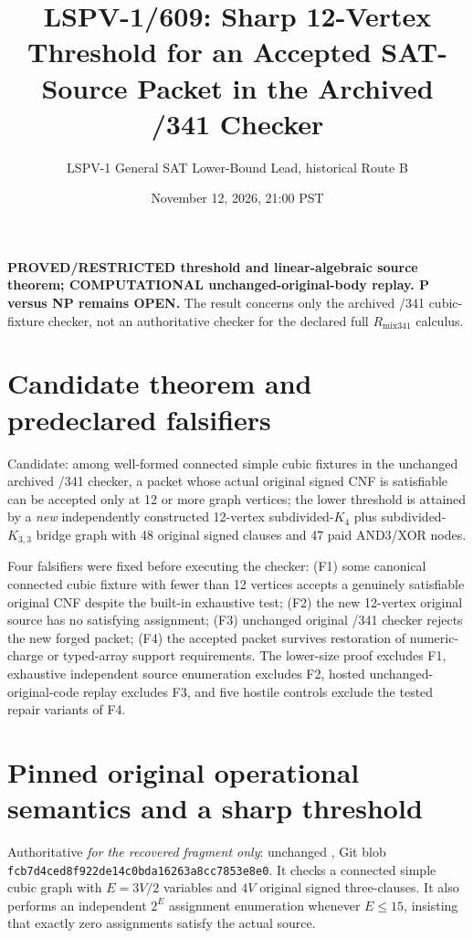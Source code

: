 \documentclass[11pt]{article}
\title{LSPV-1/609: Sharp 12-Vertex Threshold for an Accepted SAT-Source Packet in the Archived /341 Checker}
\author{LSPV-1 General SAT Lower-Bound Lead, historical Route B}
\date{November 12, 2026, 21:00 PST}
\begin{document}
\maketitle
\noindent\textbf{PROVED/RESTRICTED threshold and linear-algebraic source theorem;
COMPUTATIONAL unchanged-original-body replay. P versus NP remains OPEN.}
The result concerns only the archived /341 cubic-fixture checker, not an
authoritative checker for the declared full $R_{\mathrm{mix341}}$ calculus.

\section*{Candidate theorem and predeclared falsifiers}
Candidate: among well-formed connected simple cubic fixtures in the unchanged
archived /341 checker, a packet whose actual original signed CNF is satisfiable
can be accepted only at 12 or more graph vertices; the lower threshold is
attained by a \emph{new} independently constructed 12-vertex subdivided-$K_4$
plus subdivided-$K_{3,3}$ bridge graph with 48 original signed clauses and 47
paid AND3/XOR nodes.

\noindent Four falsifiers were fixed before executing the checker:
(F1) some canonical connected cubic fixture with fewer than 12 vertices
accepts a genuinely satisfiable original CNF despite the built-in exhaustive
test; (F2) the new 12-vertex original source has no satisfying assignment;
(F3) unchanged original /341 checker rejects the new forged packet; (F4) the
accepted packet survives restoration of numeric-charge or typed-array support
requirements. The lower-size proof excludes F1, exhaustive independent source
enumeration excludes F2, hosted unchanged-original-code replay excludes F3,
and five hostile controls exclude the tested repair variants of F4.

\section*{Pinned original operational semantics and a sharp threshold}
Authoritative \emph{for the recovered fragment only}: unchanged
,
Git blob \texttt{fcb7d4ced8f922de14c0bda16263a8cc7853e8e0}.
It checks a connected simple cubic graph with $E=3V/2$ variables and
$4V$ original signed three-clauses. It also performs an independent
$2^E$ assignment enumeration whenever $E\le15$, insisting that exactly
zero assignments satisfy the actual source.
\end{document}
